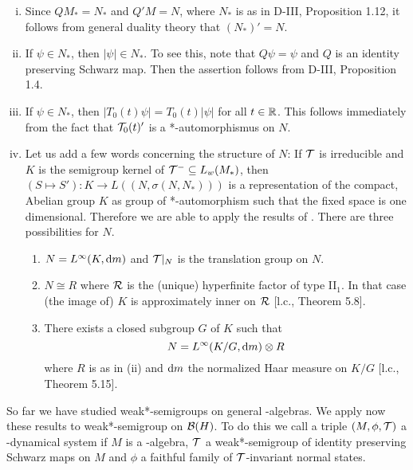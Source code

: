 \begin{remarks}\label{rem:d4-3.6}
\begin{enumerate}[(i), wide]
\item
Since $QM_{*} = N_{*}$ and $Q'M = N$, where $N_{*}$ is as in D-III, Proposition 1.12, it follows from general duality theory that $(N_{*})' = N$.

\item
If $\psi \in N_{*}$, then $|\psi| \in N_{*}$.
To see this, note that $Q\psi = \psi$ and $Q$ is an identity preserving Schwarz map.
Then the assertion follows from D-III, Proposition 1.4.

\item
If $\psi \in N_{*}$, then $|T_{0}(t)\psi| = T_{0}(t)|\psi|$ for all $t \in \mathbb{R}$.
This follows immediately from the fact that $\mathcal{T}_{0}(t)'$ is a *-automorphismus on $N$.

\item
Let us add a few words concerning the structure of $N$: If $\mathcal{T}$ is irreducible and $K$ is the semigroup kernel of $\mathcal{T}^{-} \subseteq L_{w}(M_{*})$, then $(S \mapsto S'): K \to L((N,\sigma(N,N_{*})))$ is a representation of the compact, Abelian group $K$ as group of *-automorphism such that the fixed space is one dimensional.
Therefore we are able to apply the results of \citet{olesen:1980}.
There are three possibilities for $N$.

\begin{enumerate}[1.]
\item
$N = L^{\infty}(K,\mathop{}\!\mathrm{d}{m})$ and $\mathcal{T}|_{N}$ is the translation group on $N$.

\item
$N \cong R$ where $\mathcal{R}$ is the (unique) hyperfinite factor of type II$_{1}$.
In that case (the image of) $K$ is approximately inner on $\mathcal{R}$ [l.c., Theorem 5.8].


\item
There exists a closed subgroup $ G $  of $ K $  such that
\[
N = L^{\infty}(K/G, \mathop{}\!\mathrm{d}{m}) \otimes R
\]
where $ R $  is as in (ii) and $ \mathop{}\!\mathrm{d}{m} $  the normalized Haar measure on $ K/G $  [l.c., Theorem 5.15].
\end{enumerate}
\end{enumerate}
\end{remarks}
So far we have studied weak*-semigroups on general \WA-algebras.
We apply now these results to weak*-semigroup on $ \mathcal{B}(H) $.
To do this we call a triple $ (M,\phi,\mathcal{T}) $  a \WA-dynamical system if $ M $  is a \WA-algebra, $ \mathcal{T}$ a weak*-semigroup of identity preserving Schwarz maps on $ M $  and $ \phi $  a faithful family of $ \mathcal{T} $-invariant normal states.
